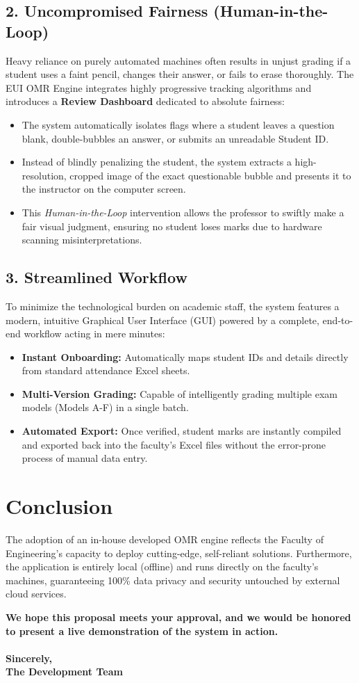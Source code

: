 \documentclass[12pt, a4paper]{article}
\begin{document}
\subsection*{2. Uncompromised Fairness (Human-in-the-Loop)}
Heavy reliance on purely automated machines often results in unjust grading if a student uses a faint pencil, changes their answer, or fails to erase thoroughly. The EUI OMR Engine integrates highly progressive tracking algorithms and introduces a \textbf{Review Dashboard} dedicated to absolute fairness:
\begin{itemize}
    \item The system automatically isolates flags where a student leaves a question blank, double-bubbles an answer, or submits an unreadable Student ID.
    \item Instead of blindly penalizing the student, the system extracts a high-resolution, cropped image of the exact questionable bubble and presents it to the instructor on the computer screen.
    \item This \textit{Human-in-the-Loop} intervention allows the professor to swiftly make a fair visual judgment, ensuring no student loses marks due to hardware scanning misinterpretations.
\end{itemize}

\subsection*{3. Streamlined Workflow}
To minimize the technological burden on academic staff, the system features a modern, intuitive Graphical User Interface (GUI) powered by a complete, end-to-end workflow acting in mere minutes:
\begin{itemize}
    \item \textbf{Instant Onboarding:} Automatically maps student IDs and details directly from standard attendance Excel sheets.
    \item \textbf{Multi-Version Grading:} Capable of intelligently grading multiple exam models (Models A-F) in a single batch.
    \item \textbf{Automated Export:} Once verified, student marks are instantly compiled and exported back into the faculty’s Excel files without the error-prone process of manual data entry.
\end{itemize}

\section*{Conclusion}
The adoption of an in-house developed OMR engine reflects the Faculty of Engineering’s capacity to deploy cutting-edge, self-reliant solutions. Furthermore, the application is entirely local (offline) and runs directly on the faculty's machines, guaranteeing 100\% data privacy and security untouched by external cloud services.

\vspace{1cm}
\noindent
\textbf{We hope this proposal meets your approval, and we would be honored to present a live demonstration of the system in action.} \\\\
\textbf{Sincerely,}\\
\textbf{The Development Team}
\end{document}
